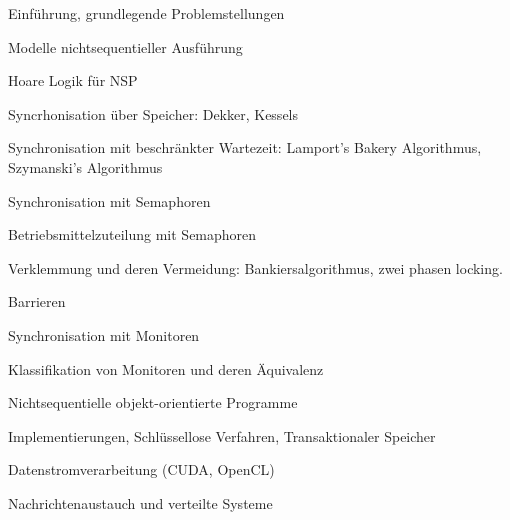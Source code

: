 Einführung, grundlegende Problemstellungen

Modelle nichtsequentieller Ausführung

Hoare Logik für NSP

Syncrhonisation über Speicher: Dekker, Kessels

Synchronisation mit beschränkter Wartezeit: Lamport's Bakery Algorithmus, Szymanski's Algorithmus

Synchronisation mit Semaphoren

Betriebsmittelzuteilung mit Semaphoren

Verklemmung und deren Vermeidung: Bankiersalgorithmus, zwei phasen locking.

Barrieren

Synchronisation mit Monitoren

Klassifikation von Monitoren und deren Äquivalenz

Nichtsequentielle objekt-orientierte Programme

Implementierungen, Schlüssellose Verfahren, Transaktionaler Speicher

Datenstromverarbeitung (CUDA, OpenCL)

Nachrichtenaustauch und verteilte Systeme

